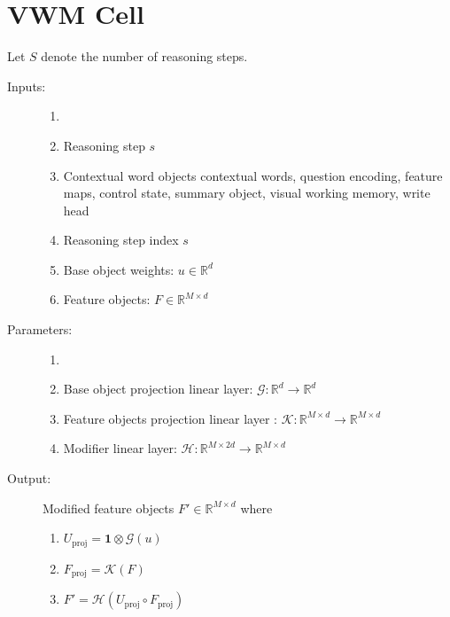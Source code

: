 \documentclass{article}
\theoremstyle{remark}
\theoremstyle{definition}
\newcommand{\Reals}{\mathbb{R}}
\newcommand{\cG}{\mathcal{G}}
\newcommand{\cK}{\mathcal{K}}
\newcommand{\cH}{\mathcal{H}}
\newcommand{\vect}[1]{\mathbf{#1}}
\newcommand{\vone}{\vect{1}}
\newcommand{\proj}{\mathrm{proj}}
\begin{document}
\section{VWM Cell}
Let $S$ denote the number of reasoning steps.

\begin{description}
	\item[Inputs:] 
	\begin{enumerate}
		\item[]
		\item Reasoning step $s$
		\item Contextual word objects contextual words, question encoding, feature maps,
		control state, summary object, visual working memory, write head
		\item Reasoning step index $s$
		\item Base object weights: $u \in \Reals^d$
		\item Feature objects: $F \in \Reals^{M \times d}$	
	\end{enumerate}
	
	\item[Parameters:] 
	\begin{enumerate}
		\item[]
		\item Base object projection linear layer: $\cG: \Reals^d \to \Reals^d$
		\item Feature objects projection linear layer : $\cK: \Reals^{M \times d} \to \Reals^{M \times d}$
		\item Modifier linear layer:  $\cH: \Reals^{M \times 2d} \to \Reals^{M \times d}$	
	\end{enumerate}
	
	\item[Output:] Modified feature objects $F' \in  \Reals^{M \times d}$ where
	\begin{enumerate}
		\item $U_{\proj} = \vone \otimes \cG(u)$
		\item $F_{\proj} = \cK(F)$
		\item $F' = \cH(U_{\proj}  \circ F_{\proj})$
	\end{enumerate}
\end{description}
\end{document}
